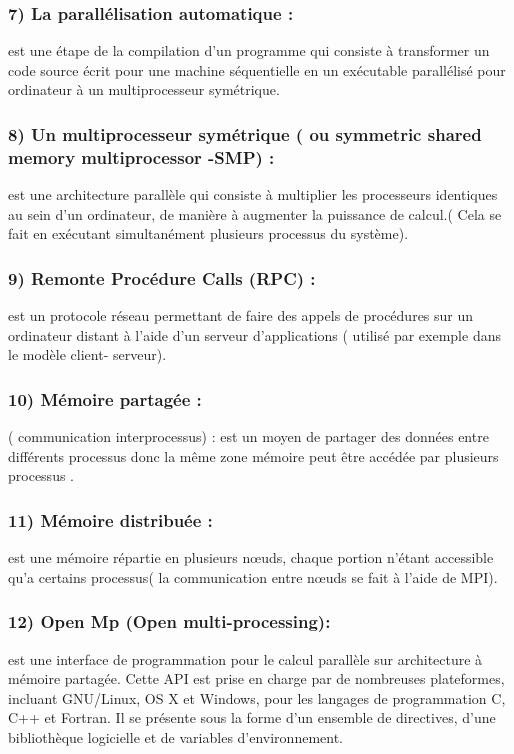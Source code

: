 \documentclass[12pt,titlepage]{report}
\begin{document}
\subsubsection{7) La parallélisation automatique :}est une étape de la compilation d'un programme qui consiste à transformer un code source écrit pour une machine séquentielle en un exécutable parallélisé pour ordinateur à un multiprocesseur symétrique.\\

\subsubsection{8) Un multiprocesseur symétrique ( ou symmetric shared memory multiprocessor -SMP) : }est une architecture parallèle qui consiste à multiplier les processeurs identiques au sein d'un ordinateur, de manière à augmenter la puissance de calcul.( Cela se fait en exécutant simultanément plusieurs processus du système).\\

\subsubsection{9) Remonte Procédure Calls (RPC) :} est un protocole réseau permettant de faire des appels de procédures sur un ordinateur distant à l’aide d’un serveur d’applications ( utilisé par exemple dans le modèle client- serveur).\\

\subsubsection{10) Mémoire partagée : }( communication interprocessus) : est un moyen de partager des données entre différents processus donc la même zone mémoire peut être accédée par plusieurs processus .\\

\subsubsection{11) Mémoire distribuée : }est une mémoire répartie en plusieurs nœuds, chaque portion n’étant accessible qu’a certains processus( la communication entre nœuds se fait à l’aide de MPI).\\

\subsubsection{12) Open Mp (Open multi-processing):} est une interface de programmation pour le calcul parallèle sur architecture à mémoire partagée. Cette API est prise en charge par de nombreuses plateformes, incluant GNU/Linux, OS X et Windows, pour les langages de programmation C, C++ et Fortran. Il se présente sous la forme d'un ensemble de directives, d'une bibliothèque logicielle et de variables d'environnement. \\
\end{document}
